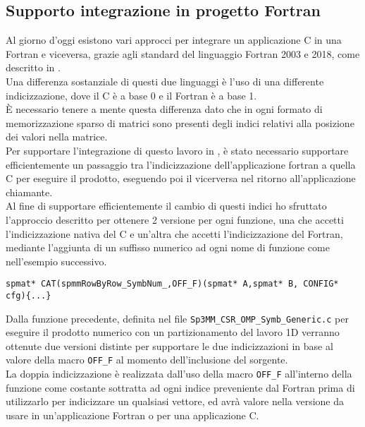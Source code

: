 \subsection{Supporto integrazione in progetto Fortran} \label{chSpMMAux:fortranIntegrate}
Al giorno d'oggi esistono vari approcci per integrare un applicazione C in una Fortran e viceversa,
grazie agli standard del linguaggio Fortran 2003 e 2018, come descritto in \cite{modernFortranExplained}.\\
Una differenza sostanziale di questi due linguaggi è l'uso di una differente indicizzazione, 
dove il C è a base 0 e il Fortran è a base 1.\\
È necessario tenere a mente questa differenza dato che in ogni formato di memorizzazione sparso di matrici 
sono presenti degli indici relativi alla posizione dei valori \nnz nella matrice.\\
Per supportare l'integrazione di questo lavoro in \cite{AMG4PSBLAS},
è stato necessario supportare efficientemente un passaggio tra l'indicizzazione
dell'applicazione fortran a quella C per eseguire il prodotto, eseguendo poi il vicerversa 
nel ritorno all'applicazione chiamante.\\
Al fine di supportare efficientemente il cambio di questi indici 
ho sfruttato l'approccio descritto per ottenere 2 versione per ogni funzione,
una che accetti l'indicizzazione nativa del C e un'altra che accetti l'indicizzazione del Fortran,
mediante l'aggiunta di un suffisso numerico ad ogni nome di funzione %
come nell'esempio successivo.\\ 
\begin{lstlisting}
spmat* CAT(spmmRowByRow_SymbNum_,OFF_F)(spmat* A,spmat* B, CONFIG* cfg){...}
\end{lstlisting}
Dalla funzione precedente, definita nel file \verb|Sp3MM_CSR_OMP_Symb_Generic.c| per eseguire il prodotto numerico con un partizionamento del lavoro 1D 
verranno ottenute due versioni distinte per supportare le due indicizzazioni in base al valore della macro \verb|OFF_F| al momento
dell'inclusione del sorgente.\\
La doppia indicizzazione è realizzata dall'uso della macro \verb|OFF_F| all'interno della funzione 
come costante sottratta ad ogni indice preveniente dal Fortran prima di utilizzarlo per indicizzare un qualsiasi vettore,
ed avrà valore  nella versione da usare in un'applicazione Fortran o  per una applicazione C.\\
